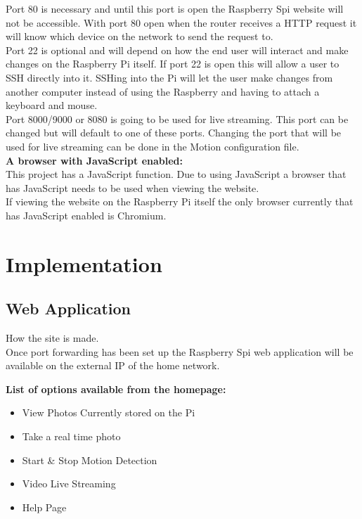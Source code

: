 \documentclass[]{report}
\begin{document}
Port 80 is necessary and until this port is open the Raspberry Spi website will not be accessible. With port 80 open when the router receives a HTTP request it will know which device on the network to send the request to.\\

Port 22 is optional and will depend on how the end user will interact and make changes on the Raspberry Pi itself. If port 22 is open this will allow a user to SSH directly into it. SSHing into the Pi will let the user make changes from another computer instead of using the Raspberry and having to attach a keyboard and mouse.\\

Port 8000/9000 or 8080 is going to be used for live streaming. This port can be changed but will default to one of these ports. Changing the port that will be used for live streaming can be done in the Motion configuration file.\\

\noindent
{\bf A browser with JavaScript enabled:}\\
\break
This project has a JavaScript function. Due to using JavaScript a browser that has JavaScript needs to be used when viewing the website.\\

If viewing the website on the Raspberry Pi itself the only browser currently that has JavaScript enabled is Chromium.\\
%
%
\chapter{Implementation}
\label{ch:implem}
\section{Web Application}
\label{sec:webapp}
How the site is made.\\
Once port forwarding has been set up the Raspberry Spi web application will be available on the external IP of the home network.

{\bf List of options available from the homepage:}
\begin{itemize}
  \item View Photos Currently stored on the Pi\\
  \item Take a real time photo\\
  \item Start \& Stop Motion Detection\\
  \item Video Live Streaming\\
  \item Help Page\\
\end{itemize}
\end{document}
